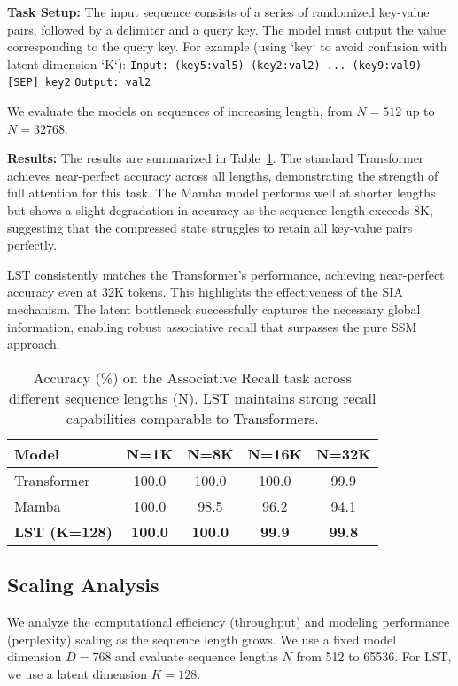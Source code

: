 \documentclass[10pt,twocolumn,letterpaper]{article}
\begin{document}
\textbf{Task Setup:} The input sequence consists of a series of randomized key-value pairs, followed by a delimiter and a query key. The model must output the value corresponding to the query key. For example (using `key` to avoid confusion with latent dimension `K`):
\texttt{Input: (key5:val5) (key2:val2) ... (key9:val9) [SEP] key2}
\texttt{Output: val2}

We evaluate the models on sequences of increasing length, from \(N=512\) up to \(N=32768\).

\textbf{Results:} The results are summarized in Table~\ref{tab:associative_recall}. The standard Transformer achieves near-perfect accuracy across all lengths, demonstrating the strength of full attention for this task. The Mamba model performs well at shorter lengths but shows a slight degradation in accuracy as the sequence length exceeds 8K, suggesting that the compressed state struggles to retain all key-value pairs perfectly.

LST consistently matches the Transformer's performance, achieving near-perfect accuracy even at 32K tokens. This highlights the effectiveness of the SIA mechanism. The latent bottleneck successfully captures the necessary global information, enabling robust associative recall that surpasses the pure SSM approach.

\begin{table}[t]
\centering
\small
\begin{tabular}{@{}lcccc@{}}
\toprule
\textbf{Model} & \textbf{N=1K} & \textbf{N=8K} & \textbf{N=16K} & \textbf{N=32K} \\
\midrule
Transformer & 100.0 & 100.0 & 100.0 & 99.9 \\
Mamba & 100.0 & 98.5 & 96.2 & 94.1 \\
\textbf{LST (K=128)} & \textbf{100.0} & \textbf{100.0} & \textbf{99.9} & \textbf{99.8} \\
\bottomrule
\end{tabular}
\caption{Accuracy (\%) on the Associative Recall task across different sequence lengths (N). LST maintains strong recall capabilities comparable to Transformers.}
\label{tab:associative_recall}
\end{table}

\subsection{Scaling Analysis}

We analyze the computational efficiency (throughput) and modeling performance (perplexity) scaling as the sequence length grows. We use a fixed model dimension \(D=768\) and evaluate sequence lengths \(N\) from 512 to 65536. For LST, we use a latent dimension \(K=128\).
\end{document}
